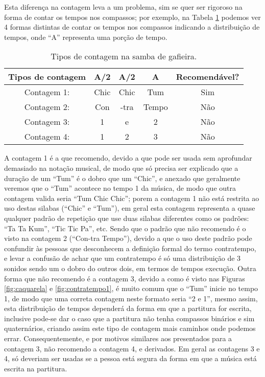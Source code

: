 Esta diferença na contagem leva a um problema, sim se quer ser rigoroso na 
forma de contar os tempos nos compassos; por exemplo, na Tabela \ref{tab:ritmo1} 
podemos ver 4 formas distintas de contar os tempos nos compassos indicando a 
distribuição de tempos, onde ``A'' representa uma porção de tempo.
\begin{table}[ht]
  \centering
  \begin{tabular}    {c|ccc|c}
    \hline
    Tipos de contagem       & A/2 & A/2   & A & Recomendável?\\
    \hline
    Contagem 1: & Chic  & Chic  & Tum   & Sim\\
    Contagem 2: & Con   & -tra  & Tempo & Não\\
    Contagem 3: & 1     & e     & 2     & Não\\
    Contagem 4: & 1     & 2     & 3     & Não\\
    \hline
  \end{tabular}
  \caption{Tipos de contagem na samba de gafieira.}
\label{tab:ritmo1}
\end{table}
A contagem 1 é a que recomendo, devido a que pode ser usada sem aprofundar demasiado 
na notação musical, de modo que só precisa ser explicado que a duração de um 
``Tum'' é o dobro que um ``Chic'', e anexado que geralmente veremos que o ``Tum''
acontece no tempo 1 da música, de modo que outra contagem valida seria ``Tum Chic Chic''; 
porem a contagem 1 não está restrita ao uso destas silabas (``Chic'' e ``Tum''), em geral esta
contagem representa a quase qualquer padrão de repetição
que use duas silabas diferentes como os padrões: ``Ta Ta Kum'', ``Tic Tic Pa'', etc. Sendo
que o padrão que não recomendo é o visto na contagem 2 (``Con-tra Tempo''), devido
a que o uso deste padrão pode confundir às pessoas que desconhecem a definição formal
do termo contratempo, e levar a confusão de achar que um contratempo é só uma 
distribuição de 3 sonidos sendo um o dobro do outros dois, em termos de tempos execução.
Outra forma que não recomendo é a contagem 3, devido a como é visto nas Figuras 
\ref{fig:caquarela} e \ref{fig:contratempo1}, é muito comum que o ``Tum'' 
inicie no tempo 1, de modo que uma correta contagem neste formato seria ``2 e 1'',
mesmo assim, esta distribuição de tempos dependerá da forma em que a partitura for
escrita, inclusive pode-se dar o caso que a partitura não tenha compassos binários 
e sim quaternários, criando assim este tipo de contagem mais caminhos onde podemos errar.
Consequentemente, e por motivos similares aos presentados para a contagem 3, 
não recomendo a contagem 4, e derivados. Em geral as contagens 3 e 4, só deveriam 
ser usadas se a pessoa está segura da forma em que a música está escrita na partitura.




